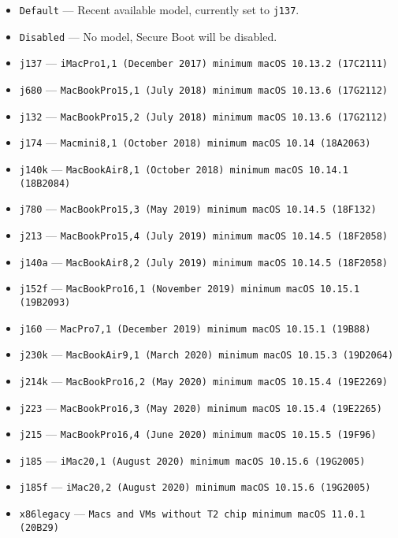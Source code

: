 \documentclass[]{article}
\providecommand{\tightlist}{%
  \setlength{\itemsep}{0pt}\setlength{\parskip}{0pt}}
\begin{document}
\begin{enumerate}
  \begin{itemize}
  \tightlist
  \item \texttt{Default} --- Recent available model, currently set to \texttt{j137}.
  \item \texttt{Disabled} --- No model, Secure Boot will be disabled.
  \item \texttt{j137} --- \texttt{iMacPro1,1 (December 2017) minimum macOS 10.13.2 (17C2111)}
  \item \texttt{j680} --- \texttt{MacBookPro15,1 (July 2018) minimum macOS 10.13.6 (17G2112)}
  \item \texttt{j132} --- \texttt{MacBookPro15,2 (July 2018) minimum macOS 10.13.6 (17G2112)}
  \item \texttt{j174} --- \texttt{Macmini8,1 (October 2018) minimum macOS 10.14 (18A2063)}
  \item \texttt{j140k} --- \texttt{MacBookAir8,1 (October 2018) minimum macOS 10.14.1 (18B2084)}
  \item \texttt{j780} --- \texttt{MacBookPro15,3 (May 2019)  minimum macOS 10.14.5 (18F132)}
  \item \texttt{j213} --- \texttt{MacBookPro15,4 (July 2019) minimum macOS 10.14.5 (18F2058)}
  \item \texttt{j140a} --- \texttt{MacBookAir8,2 (July 2019) minimum macOS 10.14.5 (18F2058)}
  \item \texttt{j152f} --- \texttt{MacBookPro16,1 (November 2019) minimum macOS 10.15.1 (19B2093)}
  \item \texttt{j160} --- \texttt{MacPro7,1 (December 2019) minimum macOS 10.15.1 (19B88)}
  \item \texttt{j230k} --- \texttt{MacBookAir9,1 (March 2020) minimum macOS 10.15.3 (19D2064)}
  \item \texttt{j214k} --- \texttt{MacBookPro16,2 (May 2020) minimum macOS 10.15.4 (19E2269)}
  \item \texttt{j223} --- \texttt{MacBookPro16,3 (May 2020) minimum macOS 10.15.4 (19E2265)}
  \item \texttt{j215} --- \texttt{MacBookPro16,4 (June 2020) minimum macOS 10.15.5 (19F96)}
  \item \texttt{j185} --- \texttt{iMac20,1 (August 2020) minimum macOS 10.15.6 (19G2005)}
  \item \texttt{j185f} --- \texttt{iMac20,2 (August 2020) minimum macOS 10.15.6 (19G2005)}
  \item \texttt{x86legacy} --- \texttt{Macs and VMs without T2 chip minimum macOS 11.0.1 (20B29)}
  \end{itemize}


\end{enumerate}
\end{document}
